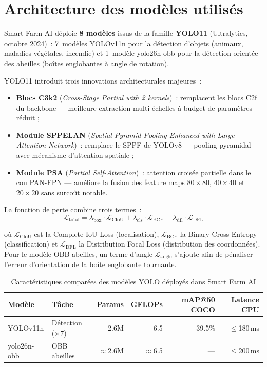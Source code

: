 \section{Architecture des modèles utilisés}

Smart Farm AI déploie \textbf{8 modèles} issus de la famille \textbf{YOLO11}
(Ultralytics, octobre 2024)~: 7~modèles YOLOv11n pour la détection d'objets
(animaux, maladies végétales, incendie) et 1~modèle yolo26n-obb pour la détection
orientée des abeilles (boîtes englobantes à angle de rotation).

YOLO11 introduit trois innovations architecturales majeures~:
\begin{itemize}
  \item \textbf{Blocs C3k2} (\textit{Cross-Stage Partial with 2 kernels})~:
        remplacent les blocs C2f du backbone — meilleure extraction multi-échelles
        à budget de paramètres réduit ;
  \item \textbf{Module SPPELAN} (\textit{Spatial Pyramid Pooling Enhanced with Large
        Attention Network})~: remplace le SPPF de YOLOv8 — pooling pyramidal avec
        mécanisme d'attention spatiale ;
  \item \textbf{Module PSA} (\textit{Partial Self-Attention})~: attention croisée
        partielle dans le cou PAN-FPN — améliore la fusion des feature maps
        $80\!\times\!80$, $40\!\times\!40$ et $20\!\times\!20$ sans surcoût notable.
\end{itemize}

La fonction de perte combine trois termes~:
\begin{equation}
\mathcal{L}_\text{total} = \lambda_\text{box}\cdot\mathcal{L}_\text{CIoU}
  + \lambda_\text{cls}\cdot\mathcal{L}_\text{BCE}
  + \lambda_\text{dfl}\cdot\mathcal{L}_\text{DFL}
\label{eq:yolo11_loss}
\end{equation}

où $\mathcal{L}_\text{CIoU}$ est la Complete IoU Loss (localisation),
$\mathcal{L}_\text{BCE}$ la Binary Cross-Entropy (classification) et
$\mathcal{L}_\text{DFL}$ la Distribution Focal Loss (distribution des coordonnées).
Pour le modèle OBB abeilles, un terme d'angle $\mathcal{L}_\text{angle}$ s'ajoute
afin de pénaliser l'erreur d'orientation de la boîte englobante tournante.

\begin{table}[H]
\centering
\caption{Caractéristiques comparées des modèles YOLO déployés dans Smart Farm AI}
\label{tab:yolo11_specs}
\begin{tabular}{llrrrr}
\toprule
\textbf{Modèle} & \textbf{Tâche} & \textbf{Params} & \textbf{GFLOPs} & \textbf{mAP@50 COCO} & \textbf{Latence CPU} \\
\midrule
YOLOv11n         & Détection (×7) & 2.6M  &  6.5 & 39.5\% & $\leq$180\,ms \\
yolo26n-obb      & OBB abeilles   & $\approx$2.6M & $\approx$6.5 & ---  & $\leq$200\,ms \\
\bottomrule
\end{tabular}
\end{table}

